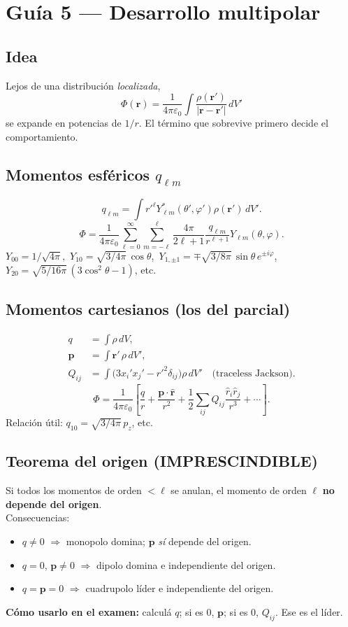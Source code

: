 \documentclass[10pt,a4paper]{article}
\newcommand{\vect}[1]{\mathbf{#1}}
\newcommand{\uv}[1]{\hat{\mathbf{#1}}}
\newcommand{\epso}{\varepsilon_0}
\begin{document}
\section{Guía 5 --- Desarrollo multipolar}

\subsection{Idea}
Lejos de una distribución \emph{localizada},
\[
\Phi(\vect{r})=\frac{1}{4\pi\epso}\int\frac{\rho(\vect{r}')}{|\vect{r}-\vect{r}'|}\,dV'
\]
se expande en potencias de $1/r$. El término que sobrevive primero decide el comportamiento.

\subsection{Momentos esféricos $q_{\ell m}$}
\[
q_{\ell m}=\int r'^\ell Y_{\ell m}^*(\theta',\varphi')\rho(\vect{r}')\,dV'.
\]
\[
\Phi=\frac{1}{4\pi\epso}\sum_{\ell=0}^\infty\sum_{m=-\ell}^\ell\frac{4\pi}{2\ell+1}\frac{q_{\ell m}}{r^{\ell+1}}Y_{\ell m}(\theta,\varphi).
\]
$Y_{00}=1/\sqrt{4\pi}$,\ 
$Y_{10}=\sqrt{3/4\pi}\,\cos\theta$,\ 
$Y_{1,\pm 1}=\mp\sqrt{3/8\pi}\,\sin\theta\,e^{\pm i\varphi}$,\\
$Y_{20}=\sqrt{5/16\pi}\,(3\cos^2\theta-1)$, etc.

\subsection{Momentos cartesianos (los del parcial)}
\begin{align}
q&=\int\rho\,dV,\\
\vect{p}&=\int\vect{r}'\,\rho\,dV',\\
Q_{ij}&=\int\!\big(3x_i'x_j'-r'^2\delta_{ij}\big)\rho\,dV'\quad\text{(traceless Jackson)}.
\end{align}
\[
\Phi=\frac{1}{4\pi\epso}\!\left[\frac{q}{r}+\frac{\vect{p}\cdot\uv{r}}{r^2}+\frac12\sum_{ij}Q_{ij}\frac{\hat r_i\hat r_j}{r^3}+\cdots\right].
\]
Relación útil: $q_{10}=\sqrt{3/4\pi}\,p_z$, etc.

\subsection{Teorema del origen (IMPRESCINDIBLE)}
Si todos los momentos de orden $<\ell$ se anulan, el momento de orden $\ell$ \textbf{no depende del origen}.\\
Consecuencias:
\begin{itemize}
\item $q\neq 0$ $\Rightarrow$ monopolo domina; $\vect{p}$ \emph{sí} depende del origen.
\item $q=0$, $\vect{p}\neq 0$ $\Rightarrow$ dipolo domina e independiente del origen.
\item $q=\vect{p}=0$ $\Rightarrow$ cuadrupolo líder e independiente del origen.
\end{itemize}
\textbf{Cómo usarlo en el examen:} calculá $q$; si es 0, $\vect{p}$; si es 0, $Q_{ij}$. Ese es el líder.
\end{document}
